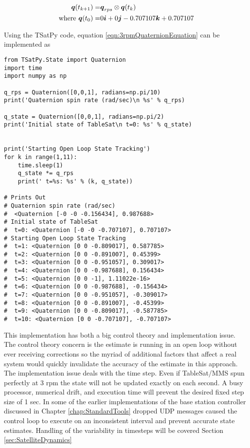 \begin{equation}
  \begin{aligned}
    \boldsymbol{q}(t_{k+1}) = & \boldsymbol{q}_{rps} \otimes \boldsymbol{q}(t_{k}) \\
    \text{where } \boldsymbol{q}(t_0) = & 0 \boldsymbol{i} +0 \boldsymbol{j} -0.707107 \boldsymbol{k} +0.707107
  \end{aligned}
  \label{eqn:3rpmQuaternionEquation}
\end{equation}

Using the TSatPy code, equation \ref{eqn:3rpmQuaternionEquation} can be implemented as

\begin{singlespace}
  \begin{verbatim}
from TSatPy.State import Quaternion
import time
import numpy as np

q_rps = Quaternion([0,0,1], radians=np.pi/10)
print('Quaternion spin rate (rad/sec)\n %s' % q_rps)

q_state = Quaternion([0,0,1], radians=np.pi/2)
print('Initial state of TableSat\n t=0: %s' % q_state)


print('Starting Open Loop State Tracking')
for k in range(1,11):
    time.sleep(1)
    q_state *= q_rps
    print(' t=%s: %s' % (k, q_state))

# Prints Out
# Quaternion spin rate (rad/sec)
#  <Quaternion [-0 -0 -0.156434], 0.987688>
# Initial state of TableSat
#  t=0: <Quaternion [-0 -0 -0.707107], 0.707107>
# Starting Open Loop State Tracking
#  t=1: <Quaternion [0 0 -0.809017], 0.587785>
#  t=2: <Quaternion [0 0 -0.891007], 0.45399>
#  t=3: <Quaternion [0 0 -0.951057], 0.309017>
#  t=4: <Quaternion [0 0 -0.987688], 0.156434>
#  t=5: <Quaternion [0 0 -1], 1.11022e-16>
#  t=6: <Quaternion [0 0 -0.987688], -0.156434>
#  t=7: <Quaternion [0 0 -0.951057], -0.309017>
#  t=8: <Quaternion [0 0 -0.891007], -0.45399>
#  t=9: <Quaternion [0 0 -0.809017], -0.587785>
#  t=10: <Quaternion [0 0 -0.707107], -0.707107>
  \end{verbatim}
  \nocite{minted}
\end{singlespace}

This implementation has both a big control theory and implementation issue.  The control theory concern is the estimate is running in an open loop without ever receiving corrections so the myriad of additional factors that affect a real system would quickly invalidate the accuracy of the estimate in this approach.  The implementation issue deals with the time step.  Even if TableSat/MMS spun perfectly at 3 rpm the state will not be updated exactly on each second.  A busy processor, numerical drift, and execution time will prevent the desired fixed step size of 1 sec.  In some of the earlier implementations of the base station controller discussed in Chapter \ref{chap:StandardTools} dropped UDP messages caused the control loop to execute on an inconsistent interval and prevent accurate state estimates.  Handling of the variability in timesteps will be covered Section \ref{sec:SatelliteDynamics}


